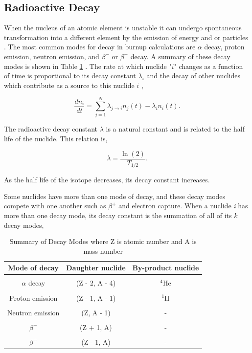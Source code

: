 \subsection{Radioactive Decay}
When the nucleus of an atomic element is unstable it can undergo spontaneous transformation into a different element by the emission of energy and or particles \cite{duderstadt1976}. The most common modes for decay in burnup calculations are $\alpha$ decay, proton emission, neutron emission, and $\beta^{-}$ or $\beta^{+}$ decay. A summary of these decay modes is shown in Table \ref{tab:decayModes} \cite{pusaThesis}. The rate at which nuclide "$i$" changes as a function of time is proportional to its decay constant $\lambda_{i}$ and the decay of other nuclides which contribute as a source to this nuclide $i$  \cite{duderstadt1976},

\begin{equation}
    \frac{dn_{i}}{dt} = \sum_{j=1}^{N} \lambda_{j\rightarrow i}n_{j}(t) -\lambda_{i} n_{i}(t).
    \label{eq:decaySingleMode}
\end{equation}

\noindent The radioactive decay constant $\lambda$ is a natural constant and is related to the half life of the nuclide. This relation is,

\begin{equation}
    \lambda = \frac{\ln(2)}{T_{1/2}}.
\end{equation}

\noindent As the half life of the isotope decreases, its decay constant increases. 

Some nuclides have more than one mode of decay, and these decay modes compete with one another such as $\beta^{+}$ and electron capture. When a nuclide \textit{i} has more than one decay mode, its decay constant is the summation of all of its $k$ decay modes,

\clearpage

\begin{table}[t]
    \caption{\label{tab:decayModes} Summary of Decay Modes where Z is atomic number and A is mass number \cite{pusaThesis}}
    \centering
    \begin{tabular}{c|c|c}
    \hline
    \textbf{Mode of decay} & \textbf{Daughter nuclide} & \textbf{By-product nuclide} \\ [0.5ex] 
    \hline
    \hline
    \\ [-1em]
    $\alpha$ decay & (Z - 2, A - 4) & ${}^{4}$He \\ \hline 
    \\ [-1em]
    Proton emission & (Z - 1, A - 1) & ${}^{1}$H \\ \hline
    \\ [-1em]
    Neutron emission & (Z, A - 1) & - \\ \hline
    \\ [-1em]
    $\beta^{-}$ & (Z + 1, A) & - \\ \hline
    \\ [-1em]
    $\beta^{+}$ & (Z - 1, A) & - \\ \hline
    \end{tabular}
\end{table}

